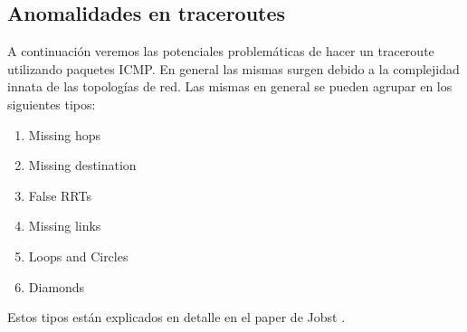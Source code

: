 \subsection{Anomalidades en traceroutes}

A continuación veremos las potenciales problemáticas de hacer un traceroute utilizando paquetes ICMP. En general las mismas surgen debido a la complejidad innata de las topologías de red. Las mismas en general se pueden agrupar en los siguientes tipos:

\begin{enumerate}
	\item Missing hops
	\item Missing destination
	\item False RRTs
	\item Missing links
	\item Loops and Circles
	\item Diamonds
\end{enumerate}

Estos tipos están explicados en detalle en el paper de Jobst \cite{jobst2012traceroute}.